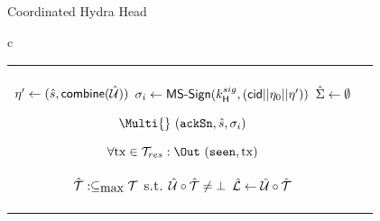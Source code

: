 \begin{figure*}[t!]
\begin{algobox}{Coordinated Hydra Head}
\begin{tabular}{c}
\begin{tabular}{c@{}c}
{\begin{walgo}{0.65}
{{{                $\eta' \gets (\hats, \combine(\hatmU))$ \; %
                $\sigma_i \gets \mathsf{MS\textsf{-}{}Sign}(k^{sig}_\mathsf{H}, (\mathsf{cid} || \eta_{0} || \eta'))$ \; %
                $\hat{\Sigma} \gets \emptyset$

                $\Multi{}~(\hpAS,\hats,\msSig_i)$ \; %

                $\forall \tx \in \mT_{res}: \Out~(\hpSeen,\tx)$ \; %

                $\hat {\mathcal T} :\subseteq_{\mbox{max}} {\mathcal T}$ s.t. $\hat {\mathcal U}\circ\hat {\mathcal T}\not=\bot$ \; %
                $\hat {\mathcal L} \gets \hat {\mathcal U}\circ\hat {\mathcal T}$
              }
            }
           }
          
        \end{walgo}
        }
        &

        \adjustbox{valign=t,scale=\sfact}{
        \begin{walgo}{0.6}
          \On{$(\hpAS,s,\msSig_j)$ from $\party_j$}{ %

            \Req{} $s \in \{\hats,\hats+1\} ~ \land ~ (j,\msSig_j) \notin \hatSigma$
            \; %

            \Wait{$\hats=s$
            }{ %
            

            $\hatSigma \gets \hatSigma \cup (j,\msSig_j)$ \; %

            \If{$\forall k \in [1..n]: (k,\cdot) \in \hatSigma$}{ %
              $\msCSig \gets \msComb(\hydraKeys, \hatSigma)$ \; %

              $\eta' \gets (\hats, \combine(\hatmU))$ \; %
              \Req{} $\msVfy(\msCVK, (\cid || \eta_{0} || \eta'), \msCSig)$ \;
              $\barmU \gets \hatmU$ \; %
              $\bars \gets \hats$ \; %
              $\barsigma \gets \msCSig$ \; %

              $\forall \tx \in \mT_{res} : \Out (\hpConf,\tx)$ \; %

              \If{$\hats = \bars \land \hpLdr(\bars + 1) = i$}{%
                \Multi{} $(\hpRS,\bars+1,\hatmT^{\downarrow1})$ \;%
              }
            }
          } }
        \end{walgo}

          }

      \end{tabular}

      \\
      \\


\end{tabular}
\end{algobox}
\end{figure*}
